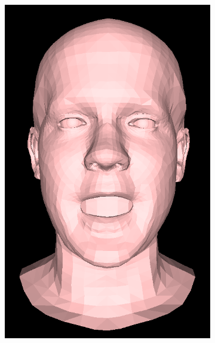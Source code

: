 \begin{figure}[h]
\begin{subfigure}[b]{0.24\textwidth}
        \includegraphics[width=\textwidth]{figures/blendshape_interp/1/00003.png}
    \end{subfigure}
    \begin{subfigure}[b]{0.24\textwidth}

\end{subfigure}
\end{figure}
